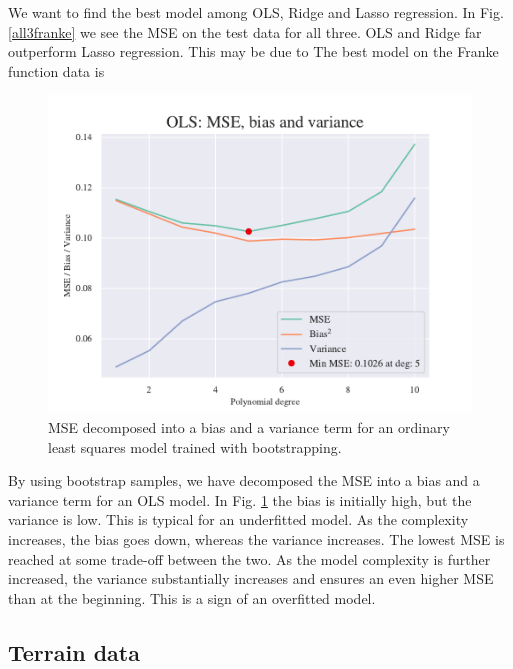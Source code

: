We want to find the best model among OLS, Ridge and Lasso regression. 
In Fig. \ref{all3franke} we see the MSE on the test data for all three. 
OLS and Ridge far outperform Lasso regression. This may be due to  
The best model on the Franke function data is  


\begin{figure}
    \centering
    \includegraphics[width=1\linewidth]{project_1/figures/figures_in_report/bias_var_Franke_Noise_bootstrap.pdf}
    \caption{MSE decomposed into a bias and a variance term for an ordinary least squares model trained with bootstrapping.
}
    \label{bias_var_trade}
\end{figure}

By using bootstrap samples, we have decomposed the MSE into a bias and a variance term for an OLS model. 
In Fig. \ref{bias_var_trade} the bias is initially high, but the variance is low. This is typical for an underfitted model. As the complexity increases, the bias goes down, whereas the variance increases. The lowest MSE is reached at some trade-off between the two. As the model complexity is further increased, the variance substantially increases and ensures an even higher MSE than at the beginning. This is a sign of an overfitted model.

\subsection{Terrain data}

